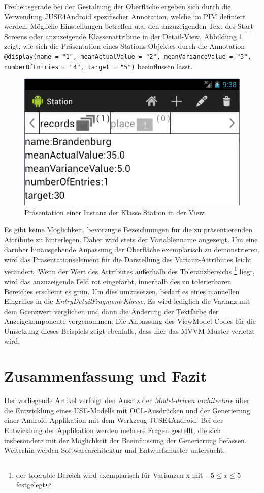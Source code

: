\documentclass[a4paper,twoside]{article}
\begin{document}
Freiheitsgerade bei der Gestaltung der Oberfläche ergeben sich durch die Verwendung JUSE4Android spezifischer Annotation, welche im PIM definiert werden. Mögliche Einstellungen betreffen u.a. den anzuzeigenden Text des Start-Screens oder anzuzeigende Klassenattribute in der Detail-View. \cite[S.19]{SilvaMasterThesis} Abbildung \ref{fig:StationView} zeigt, wie sich die Präsentation eines Stations-Objektes durch die Annotation \texttt{@display(name = "1", meanActualValue = "2", meanVarianceValue = "3", numberOfEntries = "4", target = "5")} beeinflussen lässt.
\begin{figure}[!h]
	\centering
	\includegraphics[scale=.6]{pics/StationView.png}
	\caption{Präsentation einer Instanz der Klasse Station in der View}
	\label{fig:StationView}
\end{figure}
Es gibt keine Möglichkeit, bevorzugte Bezeichnungen für die zu präsentierenden Attribute zu hinterlegen. Daher wird stets der Variablenname angezeigt. 
Um eine darüber hinausgehende Anpassung der Oberfläche exemplarisch zu demonstrieren, wird das Präsentationselement für die Darstellung des Varianz-Attributes leicht verändert. Wenn der Wert des Attributes außerhalb des Toleranzbereichs \footnote{der tolerable Bereich wird exemplarisch für Varianzen x mit \(-5 \le x \le 5\) festgelegt} liegt, wird das anzuzeigende Feld rot eingefärbt, innerhalb des zu tolerierbaren Bereiches erscheint es grün. Um dies umzusetzen, bedarf es eines manuellen Eingriffes in die \textit{EntryDetailFragment-Klasse}. Es wird lediglich die Varianz mit dem Grenzwert verglichen und dann die Änderung der Textfarbe der Anzeigekomponente vorgenommen. Die Anpassung des ViewModel-Codes für die Umsetzung dieses Beispiels zeigt ebenfalls, dass hier das MVVM-Muster verletzt wird.

\section{Zusammenfassung und Fazit}
Der vorliegende Artikel verfolgt den Ansatz der \textit{Model-driven architecture} über die Entwicklung eines USE-Modells mit OCL-Ausdrücken und der Generierung einer Android-Applikation mit dem Werkzeug JUSE4Android. Bei der Entwicklung der Applikation werden mehrere Fragen gestellt, die sich insbesondere mit der Möglichkeit der Beeinflussung der Generierung befassen. Weiterhin werden Softwarearchitektur und Entwurfsmuster untersucht. 
\\
\end{document}
